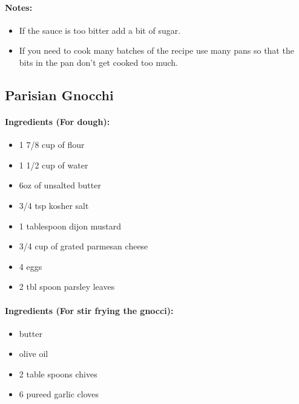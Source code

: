 \documentclass{article}
\begin{document}
\paragraph{Notes:}
\begin{itemize}
    \item If the sauce is too bitter add a bit of sugar.
    \item If you need to cook many batches of the recipe use many pans so that the bits in the pan don't get cooked too much.
\end{itemize}

\subsection{Parisian Gnocchi} 

\paragraph{Ingredients (For dough):}
\begin{itemize}
    \item 1 7/8 cup of flour
    \item 1 1/2 cup of water
    \item 6oz of unsalted butter
    \item 3/4 tsp kosher salt
    \item 1 tablespoon dijon mustard
    \item 3/4 cup of grated parmesan cheese
    \item 4 eggs
    \item 2 tbl spoon parsley leaves
\end{itemize}  

\paragraph{Ingredients (For stir frying the gnocci):}
\begin{itemize}
    \item butter
    \item olive oil
    \item 2 table spoons chives
    \item 6 pureed garlic cloves
\end{itemize}  
\end{document}

